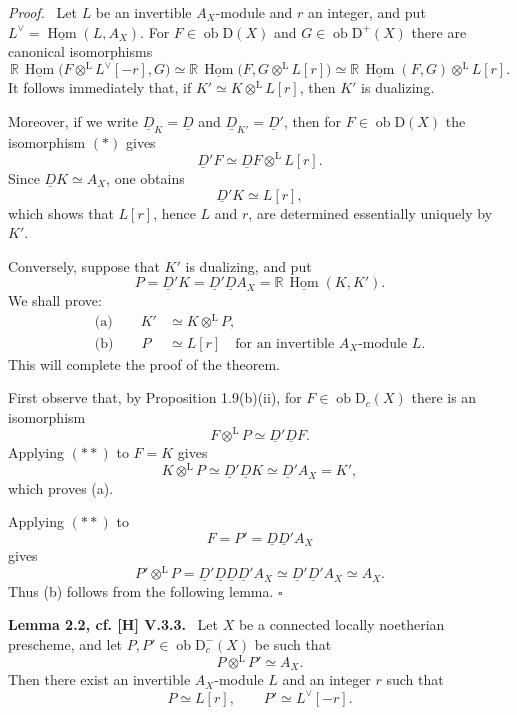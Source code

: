 \documentclass[11pt]{article}
\providecommand{\qedtext}{\hfill$\square$}
\newenvironment{statement}[1]{\par\medskip\noindent\textbf{#1.}\ }{\par\medskip}
\newenvironment{prooftext}[1][Proof]{\par\noindent\emph{#1.}\ }{\par\medskip}
\DeclareMathOperator{\Hom}{Hom}
\newcommand{\D}{\mathrm{D}}
\newcommand{\ob}{\operatorname{ob}}
\providecommand{\Hom}{\operatorname{Hom}}
\providecommand{\ob}{\operatorname{ob}}
\providecommand{\Hom}{\operatorname{Hom}}
\providecommand{\qedtext}{\hfill$\square$}
\begin{document}
\begin{prooftext}
Let $L$ be an invertible $A_X$-module and $r$ an integer, and put $L^\vee=\underline{\Hom}(L,A_X)$. For $F\in\ob\D(X)$ and $G\in\ob\D^+(X)$ there are canonical isomorphisms
\begin{equation}
\mathbb{R}\,\underline{\Hom}\bigl(F\otimes^{\mathrm L}L^\vee[-r],G\bigr)
   \simeq
\mathbb{R}\,\underline{\Hom}\bigl(F,G\otimes^{\mathrm L}L[r]\bigr)
   \simeq
\mathbb{R}\,\underline{\Hom}(F,G)\otimes^{\mathrm L}L[r]. \tag{*}
\end{equation}
It follows immediately that, if $K'\simeq K\otimes^{\mathrm L}L[r]$, then $K'$ is dualizing.

Moreover, if we write $\underline D_K=\underline D$ and $\underline D_{K'}=\underline D'$, then for $F\in\ob\D(X)$ the isomorphism $(*)$ gives
\[
   \underline D'F\simeq\underline DF\otimes^{\mathrm L}L[r].
\]
Since $\underline DK\simeq A_X$, one obtains
\[
   \underline D'K\simeq L[r],
\]
which shows that $L[r]$, hence $L$ and $r$, are determined essentially uniquely by $K'$.

Conversely, suppose that $K'$ is dualizing, and put
\[
   P=\underline D'K=\underline D'\underline DA_X=\mathbb{R}\,\underline{\Hom}(K,K').
\]
We shall prove:
\begin{align*}
\text{(a)}\qquad K'&\simeq K\otimes^{\mathrm L}P,\\
\text{(b)}\qquad P&\simeq L[r]\quad\text{for an invertible }A_X\text{-module }L.
\end{align*}
This will complete the proof of the theorem.

First observe that, by Proposition 1.9(b)(ii), for $F\in\ob\D_c(X)$ there is an isomorphism
\begin{equation}
F\otimes^{\mathrm L}P\simeq\underline D'\underline DF. \tag{**}
\end{equation}
Applying $(**)$ to $F=K$ gives
\[
   K\otimes^{\mathrm L}P\simeq\underline D'\underline DK\simeq\underline D'A_X=K',
\]
which proves (a).

Applying $(**)$ to
\[
   F=P'=\underline D\underline D'A_X
\]
gives
\[
   P'\otimes^{\mathrm L}P
      =\underline D'\underline D\underline D\underline D'A_X
      \simeq\underline D'\underline D'A_X
      \simeq A_X.
\]
Thus (b) follows from the following lemma. \qedtext
\end{prooftext}

\begin{statement}{Lemma 2.2, cf. [H] V.3.3}
Let $X$ be a connected locally noetherian prescheme, and let $P,P'\in\ob\D_c^-(X)$ be such that
\[
   P\otimes^{\mathrm L}P'\simeq A_X.
\]
Then there exist an invertible $A_X$-module $L$ and an integer $r$ such that
\[
   P\simeq L[r],\qquad P'\simeq L^\vee[-r].
\]
\end{statement}
\end{document}
